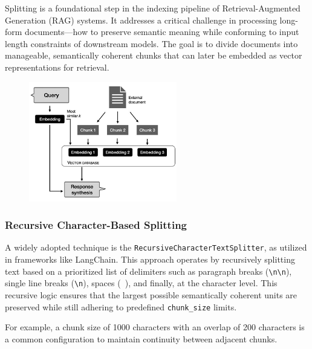 \documentclass[twocolumn, 10pt]{article}
\begin{document}
Splitting is a foundational step in the indexing pipeline of Retrieval-Augmented Generation (RAG) systems. It addresses a critical challenge in processing long-form documents—how to preserve semantic meaning while conforming to input length constraints of downstream models. The goal is to divide documents into manageable, semantically coherent chunks that can later be embedded as vector representations for retrieval.

\begin{figure}[H]
    \centering
    \includegraphics[width=\linewidth]{secondimage.jpg}
    \caption{}
    \label{fig:indexing-process}
\end{figure}


\subsubsection{Recursive Character-Based Splitting}

A widely adopted technique is the \texttt{RecursiveCharacterTextSplitter}, as utilized in frameworks like LangChain. This approach operates by recursively splitting text based on a prioritized list of delimiters such as paragraph breaks (\texttt{\textbackslash n\textbackslash n}), single line breaks (\texttt{\textbackslash n}), spaces (\texttt{ }), and finally, at the character level. This recursive logic ensures that the largest possible semantically coherent units are preserved while still adhering to predefined \texttt{chunk\_size} limits. 

For example, a chunk size of 1000 characters with an overlap of 200 characters is a common configuration to maintain continuity between adjacent chunks.
\end{document}
